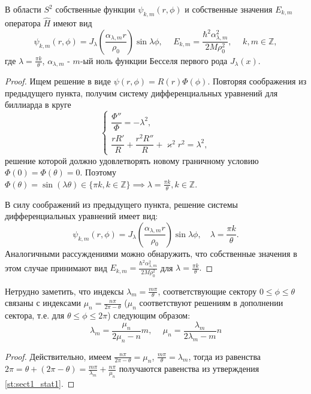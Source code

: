 \begin{statement} \cite[p.~4]{wref13}
В области $S^2$ собственные функции $\psi_{k, m}(r, \phi)$ и собственные значения $E_{k, m}$ оператора $\hat{H}$ имеют вид 
$$\psi_{k, m}(r, \phi) = J_\lambda\left(\frac{\alpha_{\lambda, m}r}{\rho_0}\right)\sin{\lambda\phi}, \hspace{15pt} E_{k, m} = \frac{\hbar^2 \alpha_{\lambda, m}^2}{2M\rho_0^2}, \hspace{15pt} k, m \in \mathbb{Z},$$
где $\lambda = \frac{\pi k}{\theta}$, $\alpha_{\lambda, m}$ - $m$-ый ноль функции Бесселя первого рода $J_\lambda(x)$.
\label{st:sect1_stat1}
\end{statement}
\begin{proof}
Ищем решение в виде $\psi(r, \phi) = R(r)\Phi(\phi)$. Повторяя соображения из предыдущего пункта, получим систему дифференциальных уравнений для биллиарда в круге 
\[
\left\{\begin{array}{cc}
    \dfrac{\Phi''}{\Phi} =-\lambda^2, \\
    \dfrac{rR'}{R} + \dfrac{r^2R''}{R} + \varkappa^2r^2 = \lambda^2,
\end{array}
\right.
\]
решение которой должно удовлетворять новому граничному условию $\Phi(0)=\Phi(\theta)=0$. Поэтому $\Phi(\theta) = \sin(\lambda \theta) \in \{\pi k, k \in \mathbb{Z}\} \implies \lambda = \frac{\pi k}{\theta}, k \in \mathbb{Z}$.

В силу соображений из предыдущего пункта, решение системы дифференциальных уравнений имеет вид:
$$\psi_{k, m}(r, \phi) = J_\lambda\left(\frac{\alpha_{\lambda, m}r}{\rho_0}\right)\sin{\lambda\phi} , \quad \lambda=\frac{\pi k}{\theta}.$$
Аналогичными рассуждениями можно обнаружить, что собственные значения в этом случае принимают вид 
$E_{k, m} = \frac{\hbar^2 \alpha_{\lambda, m}^2}{2M\rho_0^2}$ для $\lambda=\frac{\pi k}{\theta}.$
\end{proof}

\begin{consequence} \cite[p.~4]{wref13}
Нетрудно заметить, что индексы $\lambda_m = \frac{m \pi}{\theta}$, соответствующие сектору $0 \leq \phi \leq \theta$ связаны с индексами $\mu_n = \frac{n \pi}{2\pi - \theta}$ ($\mu_n$ соответствуют решениям в дополнении сектора, т.е. для $\theta \leq \phi \leq 2\pi$) следующим образом:
$$\lambda_m = \frac{\mu_n}{2\mu_n - n}m, \hspace{15pt} \mu_n = \frac{\lambda_m}{2\lambda_m - m}n$$
\end{consequence}
\begin{proof}
Действительно, имеем 
$\frac{n \pi}{2\pi - \theta} = \mu_n$, $\frac{m \pi}{\theta} = \lambda_m$, тогда из равенства $2\pi = \theta + (2\pi - \theta) = \frac{m \pi}{\lambda_m} + \frac{n \pi}{\mu_n}$ получаются равенства из утверждения \ref{st:sect1_stat1}.
\end{proof}

